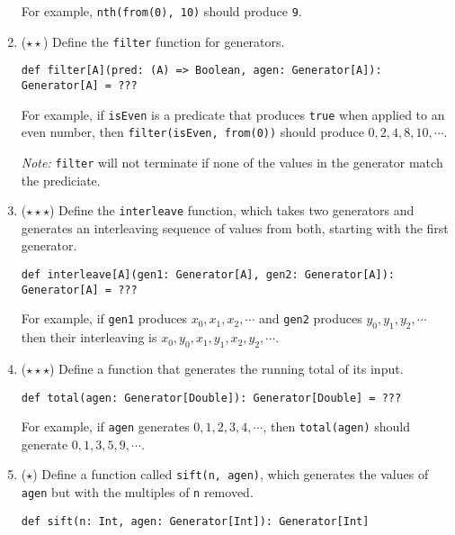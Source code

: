 \documentclass[9pt]{extbook}
\begin{document}
\begin{enumerate}
  For example, \lstinline|nth(from(0), 10)| should produce \lstinline|9|.

\item ($\star\star$) Define the \lstinline|filter| function for generators.
\begin{lstlisting}
def filter[A](pred: (A) => Boolean, agen: Generator[A]): Generator[A] = ???
\end{lstlisting}

  For example, if \lstinline|isEven| is a predicate that produces 
  \lstinline|true| when applied to an even number, then
  \lstinline|filter(isEven, from(0))| should produce $0, 2, 4, 8, 10, \cdots$.

  \emph{Note:} \lstinline|filter| will not terminate if none of the values in
  the generator match the prediciate.

  \item ($\star\star\star$)
  Define the \lstinline|interleave| function, which takes two generators
  and generates an interleaving sequence of values from both, starting with
  the first generator.

\begin{lstlisting}
def interleave[A](gen1: Generator[A], gen2: Generator[A]): Generator[A] = ???
\end{lstlisting}

  For example, if \lstinline|gen1| produces $x_0, x_1, x_2, \cdots$ and \lstinline|gen2|
  produces $y_0, y_1, y_2, \cdots$ then their interleaving is $x_0, y_0, x_1, y_1, x_2, y_2, \cdots$.


  \item ($\star\star\star$) Define a function that generates the running total
  of its input.
  
\begin{lstlisting}
def total(agen: Generator[Double]): Generator[Double] = ???
\end{lstlisting}

  For example, if \lstinline|agen| generates $0, 1, 2, 3, 4, \cdots$, 
  then \lstinline|total(agen)| should
  generate $0, 1, 3, 5, 9, \cdots$.
  
\item ($\star$) Define a function called \lstinline|sift(n, agen)|, which
generates the values of \lstinline|agen| but with the multiples of \lstinline|n|
removed.

\begin{lstlisting}
def sift(n: Int, agen: Generator[Int]): Generator[Int]
\end{lstlisting}



\end{enumerate}
\end{document}
